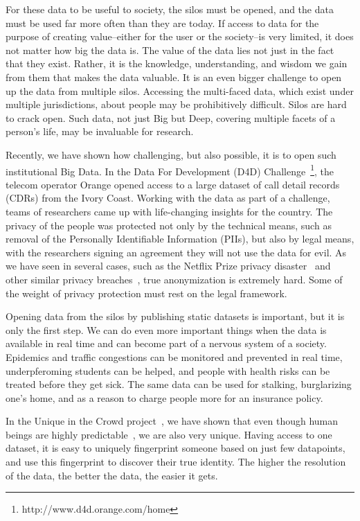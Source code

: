 For these data to be useful to society, the silos must be opened, and the data must be used far more often than they are today.
If access to data for the purpose of creating value--either for the user or the society--is very limited, it does not matter how big the data is.
The value of the data lies not just in the fact that they exist.
Rather, it is the knowledge, understanding, and wisdom we gain from them that makes the data valuable.
It is an even bigger challenge to open up the data from multiple silos.
Accessing the multi-faced data, which exist under multiple jurisdictions, about people may be prohibitively difficult.
Silos are hard to crack open.
Such data, not just Big but Deep, covering multiple facets of a person's life, may be invaluable for research.

Recently, we have shown how challenging, but also possible, it is to open such institutional Big Data.
In the Data For Development (D4D) Challenge~\footnote{http://www.d4d.orange.com/home}, the telecom operator Orange opened access to a large dataset of call detail records (CDRs) from the Ivory Coast.
Working with the data as part of a challenge, teams of researchers came up with life-changing insights for the country.
The privacy of the people was protected not only by the technical means, such as removal of the Personally Identifiable Information (PIIs), but also by legal means, with the researchers signing an agreement they will not use the data for evil.
As we have seen in several cases, such as the Netflix Prize privacy disaster~\cite{narayanan2008robust} and other similar privacy breaches~\cite{sweeney2000simple}, true anonymization is extremely hard.
Some of the weight of privacy protection must rest on the legal framework.

Opening data from the silos by publishing static datasets is important, but it is only the first step.
We can do even more important things when the data is available in real time and can become part of a nervous system of a society.
Epidemics and traffic congestions can be monitored and prevented in real time, underpferoming students can be helped, and people with health risks can be treated before they get sick. The same data can be used for stalking, burglarizing one's home, and as a reason to charge people more for an insurance policy.

In the Unique in the Crowd project~\cite{de2013unique}, we have shown that even though human beings are highly predictable~\cite{song2010limits}, we are also very unique.
Having access to one dataset, it is easy to uniquely fingerprint someone based on just few datapoints, and use this fingerprint to discover their true identity.
The higher the resolution of the data, the better the data, the easier it gets.

